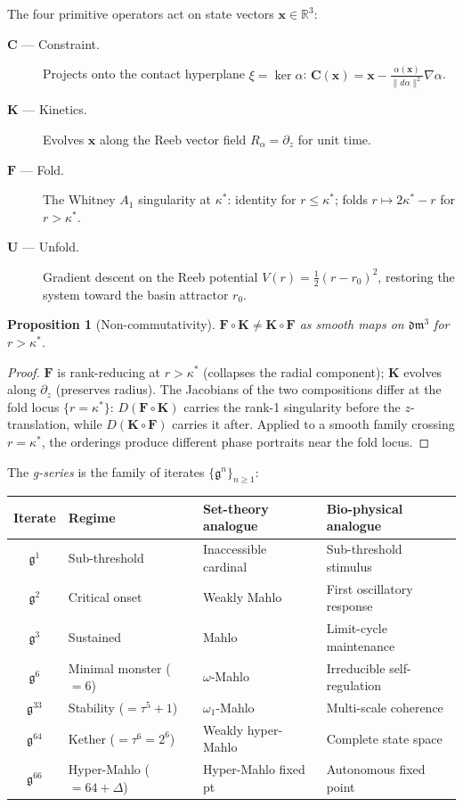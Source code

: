 \documentclass[12pt,a4paper]{amsart}
\newtheorem{proposition}[theorem]{Proposition}
\theoremstyle{definition}
\theoremstyle{remark}
\newcommand{\Cop}{\mathbf{C}}
\newcommand{\Kop}{\mathbf{K}}
\newcommand{\Fop}{\mathbf{F}}
\newcommand{\Uop}{\mathbf{U}}
\newcommand{\GG}{\mathfrak{g}}
\newcommand{\dm}{\mathfrak{dm}^3}
\newcommand{\kap}{\kappa^*}
\begin{document}
The four primitive operators act on state vectors $\mathbf{x} \in \mathbb{R}^3$:

\begin{description}
  \item[$\Cop$ --- Constraint.] Projects onto the contact hyperplane
    $\xi = \ker\alpha$: $\Cop(\mathbf{x}) = \mathbf{x} - \tfrac{\alpha(\mathbf{x})}{\|d\alpha\|^2}\nabla\alpha$.
  \item[$\Kop$ --- Kinetics.] Evolves $\mathbf{x}$ along the Reeb vector field
    $R_\alpha = \partial_z$ for unit time.
  \item[$\Fop$ --- Fold.] The Whitney $A_1$ singularity at $\kap$: identity for
    $r \leq \kap$; folds $r \mapsto 2\kap - r$ for $r > \kap$.
  \item[$\Uop$ --- Unfold.] Gradient descent on the Reeb potential
    $V(r) = \tfrac{1}{2}(r-r_0)^2$, restoring the system toward the basin attractor $r_0$.
\end{description}

\begin{proposition}[Non-commutativity]\label{prop:noncomm}
$\Fop \circ \Kop \neq \Kop \circ \Fop$ as smooth maps on $\dm$ for $r > \kap$.
\end{proposition}
\begin{proof}
$\Fop$ is rank-reducing at $r > \kap$ (collapses the radial component); $\Kop$ evolves
along $\partial_z$ (preserves radius). The Jacobians of the two compositions differ at
the fold locus $\{r = \kap\}$: $D(\Fop \circ \Kop)$ carries the rank-1 singularity
before the $z$-translation, while $D(\Kop \circ \Fop)$ carries it after. Applied to a
smooth family crossing $r = \kap$, the orderings produce different phase portraits near
the fold locus.
\end{proof}

The \emph{g-series} is the family of iterates $\{\GG^n\}_{n \geq 1}$:

\begin{center}
\small
\begin{tabular}{@{}clll@{}}
\toprule
Iterate & Regime & Set-theory analogue & Bio-physical analogue \\
\midrule
$\GG^1$ & Sub-threshold  & Inaccessible cardinal & Sub-threshold stimulus \\
$\GG^2$ & Critical onset & Weakly Mahlo & First oscillatory response \\
$\GG^3$ & Sustained       & Mahlo                 & Limit-cycle maintenance \\
$\GG^6$ & Minimal monster ($= 6$) & $\omega$-Mahlo        & Irreducible self-regulation \\
$\GG^{33}$ & Stability ($=\tau^5+1$) & $\omega_1$-Mahlo    & Multi-scale coherence \\
$\GG^{64}$ & Kether ($=\tau^6=2^6$) & Weakly hyper-Mahlo  & Complete state space \\
$\GG^{66}$ & Hyper-Mahlo ($=64+\Delta$) & Hyper-Mahlo fixed pt & Autonomous fixed point \\
\bottomrule
\end{tabular}
\end{center}
\end{document}
